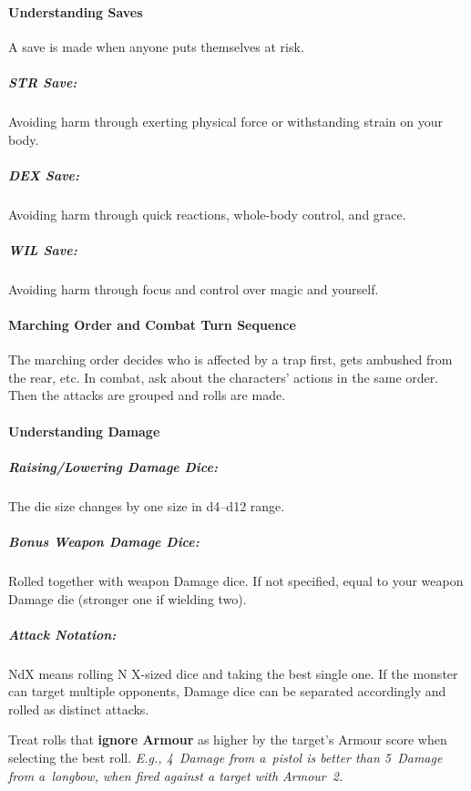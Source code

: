 \documentclass[itdr/core]{subfiles}
\begin{document}

\paragraph{Understanding Saves}
A save is made when anyone puts themselves at risk.

\subparagraph{STR Save:} Avoiding harm through exerting physical force or withstanding strain on your body.

\subparagraph{DEX Save:} Avoiding harm through quick reactions, whole-body control, and grace.

\subparagraph{WIL Save:} Avoiding harm through focus and control over magic and yourself.


\paragraph{Marching Order and Combat Turn Sequence}
The marching order decides who is affected by a trap first, gets ambushed from the rear, etc. In combat, ask about the characters' actions in the same order. Then the attacks are grouped and rolls are made.

\enlargethispage{\baselineskip}
\break

\paragraph{Understanding Damage}
\subparagraph{Raising/Lowering Damage Dice:} The die size changes by one size in d4--d12 range.

\subparagraph{Bonus Weapon Damage Dice:} Rolled together with weapon Damage dice. If not specified, equal to your weapon Damage die (stronger one if wielding two).

\subparagraph{Attack Notation:} NdX means rolling N X-sized dice and taking the best single one. If the monster can target multiple opponents, Damage dice can be separated accordingly and rolled as distinct attacks.

Treat rolls that \textbf{ignore Armour} as higher by the target's Armour score when selecting the best roll.
{\em E.g., 4~Damage from a~pistol is better than 5~Damage from a~longbow, when fired against a target with Armour~2.}
\end{document}
